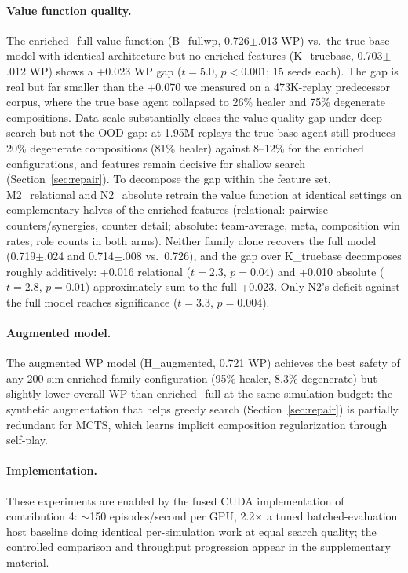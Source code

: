 \documentclass[journal]{IEEEtran}
\begin{document}
\paragraph{Value function quality.} The enriched\_full value function (B\_fullwp, 0.726$\pm$.013 WP) vs.\ the true base model with identical architecture but no enriched features (K\_truebase, 0.703$\pm$.012 WP) shows a +0.023 WP gap ($t = 5.0$, $p < 0.001$; 15 seeds each). The gap is real but far smaller than the +0.070 we measured on a 473K-replay predecessor corpus, where the true base agent collapsed to 26\% healer and 75\% degenerate compositions. Data scale substantially closes the value-quality gap under deep search but not the OOD gap: at 1.95M replays the true base agent still produces 20\% degenerate compositions (81\% healer) against 8--12\% for the enriched configurations, and features remain decisive for shallow search (Section~\ref{sec:repair}). To decompose the gap within the feature set, M2\_relational and N2\_absolute retrain the value function at identical settings on complementary halves of the enriched features (relational: pairwise counters/synergies, counter detail; absolute: team-average, meta, composition win rates; role counts in both arms). Neither family alone recovers the full model (0.719$\pm$.024 and 0.714$\pm$.008 vs.\ 0.726), and the gap over K\_truebase decomposes roughly additively: +0.016 relational ($t = 2.3$, $p = 0.04$) and +0.010 absolute ($t = 2.8$, $p = 0.01$) approximately sum to the full +0.023. Only N2's deficit against the full model reaches significance ($t = 3.3$, $p = 0.004$).
\paragraph{Augmented model.} The augmented WP model (H\_augmented, 0.721 WP) achieves the best safety of any 200-sim enriched-family configuration (95\% healer, 8.3\% degenerate) but slightly lower overall WP than enriched\_full at the same simulation budget: the synthetic augmentation that helps greedy search (Section~\ref{sec:repair}) is partially redundant for MCTS, which learns implicit composition regularization through self-play.

\paragraph{Implementation.} These experiments are enabled by the fused CUDA implementation of contribution 4: $\sim$150 episodes/second per GPU, 2.2$\times$ a tuned batched-evaluation host baseline doing identical per-simulation work at equal search quality; the controlled comparison and throughput progression appear in the supplementary material.
\end{document}
